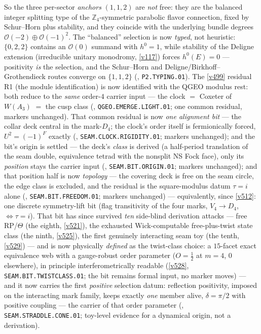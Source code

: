 \documentclass[11pt,a4paper]{article}
\theoremstyle{definition}
\begin{document}
\noindent So the three per-sector \emph{anchors} $(1,1,2)$ are \emph{not} free: they are the balanced
integer splitting type of the $\mathbb Z_4$-symmetric parabolic flavor connection, fixed by Schur--Horn
plus stability, and they coincide with the underlying bundle degrees $\mathcal O(-2)\oplus\mathcal O(-1)^2$.
The ``balanced'' selection is now \emph{typed}, not heuristic: $\{0,2,2\}$ contains an $\mathcal O(0)$
summand with $h^0=1$, while stability of the Deligne extension (irreducible unitary monodromy,
\vref{v117}) forces $h^0(E)=0$ --- positivity \emph{is} the selection, and the Schur--Horn and
Deligne/Birkhoff--Grothendieck routes converge on $\{1,1,2\}$
(, \texttt{P2.TYPING.01}). The \vref{v499} residual R1 (the
module identification) is now identified with the QGEO modulus rest: both reduce to the \emph{same}
order-$4$ carrier input --- the clock $=$ Coxeter of $W(A_3)$ $=$ the cusp class
(, \texttt{QGEO.EMERGE.LIGHT.01}; one common residual, markers
unchanged). That common residual is now \emph{one alignment bit} --- the collar deck central in the
mark-$D_4$; the clock's order itself is fermionically forced, $U^2=(-1)^F$ exactly
(, \texttt{SEAM.CLOCK.RIGIDITY.01}; markers unchanged); and the
bit's origin is settled --- the deck's \emph{class} is derived (a half-period translation of the
seam double, equivalence tetrad with the nonsplit NS Fock face), only its \emph{position} stays the
carrier input (, \texttt{SEAM.BIT.ORIGIN.01}; markers unchanged);
and that position half is now \emph{topology} --- the covering deck is free on the seam circle, the
edge class is excluded, and the residual is the square-modulus datum $\tau=i$ alone
(, \texttt{SEAM.BIT.FREEDOM.01}; markers unchanged) ---
equivalently, since \vref{v512}: one discrete symmetry-lift bit (flag transitivity of the four
marks, $V_4\to D_4$, $\iff\tau=i$). That bit has since survived \emph{ten} side-blind derivation
attacks --- free RP/$\Theta$ (the eighth, \vref{v521}), the exhausted Wick-computable
free-plus-twist state class (the ninth, \vref{v525}), the first genuinely interacting seam toy
(the tenth, \vref{v529}) --- and is now physically \emph{defined} as the twist-class choice:
a $15$-facet exact equivalence web with a gauge-robust order parameter ($O=\tfrac12$ at $m=4$,
$0$ elsewhere), in principle interferometrically readable (\vref{v528},
\texttt{SEAM.BIT.TWISTCLASS.01}; the bit remains formal input, no marker moves) --- and it now
carries the first \emph{positive} selection datum: reflection positivity, imposed on the
interacting mark family, keeps exactly \emph{one} member alive, $\delta=\pi/2$ with positive
coupling --- the carrier of that order parameter
(, \texttt{SEAM.STRADDLE.CONE.01}; toy-level evidence for a
dynamical origin, not a derivation).
\end{document}
